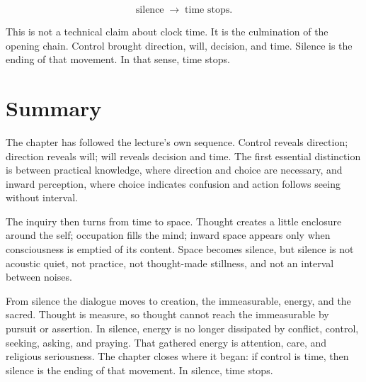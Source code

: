\begin{equation}
\text{silence}
\;\longrightarrow\;
\text{time stops}.
\end{equation}

This is not a technical claim about clock time. It is the culmination of the opening chain. Control brought direction, will, decision, and time. Silence is the ending of that movement. In that sense, time stops.

\section{Summary}

The chapter has followed the lecture's own sequence. Control reveals direction; direction reveals will; will reveals decision and time. The first essential distinction is between practical knowledge, where direction and choice are necessary, and inward perception, where choice indicates confusion and action follows seeing without interval.

The inquiry then turns from time to space. Thought creates a little enclosure around the self; occupation fills the mind; inward space appears only when consciousness is emptied of its content. Space becomes silence, but silence is not acoustic quiet, not practice, not thought-made stillness, and not an interval between noises.

From silence the dialogue moves to creation, the immeasurable, energy, and the sacred. Thought is measure, so thought cannot reach the immeasurable by pursuit or assertion. In silence, energy is no longer dissipated by conflict, control, seeking, asking, and praying. That gathered energy is attention, care, and religious seriousness. The chapter closes where it began: if control is time, then silence is the ending of that movement. In silence, time stops.